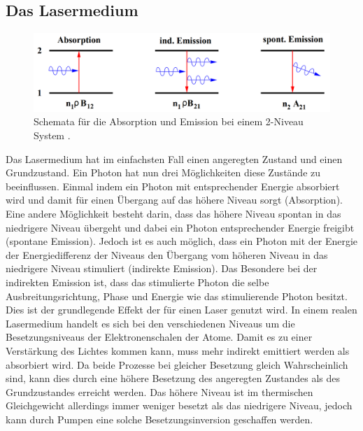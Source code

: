 \subsection{Das Lasermedium}
\begin{figure}
	\centering
	\includegraphics[width=\linewidth-100pt,height=\textheight-100pt,keepaspectratio]{content/Images/emission.png}
	\caption{Schemata für die Absorption und Emission bei einem 2-Niveau System \cite{V61}.}
\end{figure}
Das Lasermedium hat im einfachsten Fall einen angeregten Zustand und einen Grundzustand. Ein Photon hat nun drei Möglichkeiten diese Zustände zu beeinflussen. Einmal indem ein Photon mit entsprechender Energie absorbiert wird und damit für einen Übergang auf das höhere Niveau sorgt (Absorption). Eine andere Möglichkeit besteht darin, dass das höhere Niveau spontan in das niedrigere Niveau übergeht und dabei ein Photon entsprechender Energie freigibt (spontane Emission). Jedoch ist es auch möglich, dass ein Photon mit der Energie der Energiedifferenz der Niveaus den Übergang vom höheren Niveau in das niedrigere Niveau stimuliert (indirekte Emission). 
Das Besondere bei der indirekten Emission ist, dass das stimulierte Photon die selbe Ausbreitungsrichtung, Phase und Energie wie das stimulierende Photon besitzt. Dies ist der grundlegende Effekt der für einen Laser genutzt wird. In einem realen Lasermedium handelt es sich bei den verschiedenen Niveaus um die Besetzungsniveaus der Elektronenschalen der Atome. Damit es zu einer Verstärkung des Lichtes kommen kann, muss mehr indirekt emittiert werden als absorbiert wird. Da beide Prozesse bei gleicher Besetzung gleich Wahrscheinlich sind, kann dies durch eine höhere Besetzung des angeregten Zustandes als des Grundzustandes erreicht werden. Das höhere Niveau ist im thermischen Gleichgewicht allerdings immer weniger besetzt als das niedrigere Niveau, jedoch kann durch Pumpen eine solche Besetzungsinversion geschaffen werden.

